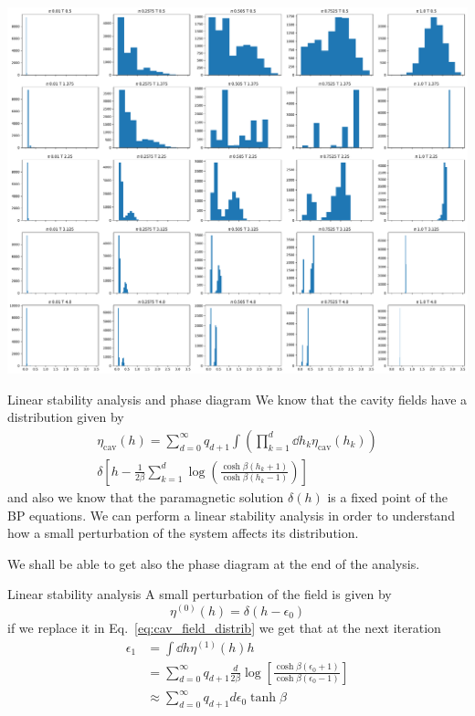 \documentclass[handout]{beamer}
\begin{document}
\begin{frame}[plain]
    \includegraphics[width=.9\textwidth]{pd_fields}
\end{frame}

\begin{frame}{Linear stability analysis and phase diagram}
    We know that the cavity fields have a distribution given by
    \begin{multline}
        \eta_{\text{cav}}(h) =
        \sum_{d=0}^{\infty} q_{d+1}
        \int \left( \prod_{k=1}^d \dd{h_k} \eta_{\text{cav}} (h_k) \right) \\
        \delta \left[ h - \frac{1}{2\beta} \sum_{k=1}^d
            \log\left( \frac{\cosh{\beta(h_k+1)}}{\cosh{\beta(h_k-1)}} \right)
        \right]
        \label{eq:cav_field_distrib}
    \end{multline}
    and also we know that the paramagnetic solution $\delta(h)$ is a
    \alert{fixed point} of the BP equations. We can perform a \alert{linear
    stability analysis} in order to understand how a small perturbation of the
    system affects its distribution.

    We shall be able to get also the phase diagram at the end of the analysis.
\end{frame}

\begin{frame}{Linear stability analysis}
    A small perturbation of the field is given by
    \begin{equation}
        \eta^{(0)} (h) = \delta(h-\epsilon_0)
    \end{equation}
    if we replace it in Eq.~\ref{eq:cav_field_distrib} we get that at the next
    iteration
    \begin{align}
        \epsilon_1 &= \int \dd{h} \eta^{(1)}(h) h\\
                   &= \sum_{d=0}^{\infty} q_{d+1} \frac{d}{2\beta} \log \left[
                       \frac{\cosh{\beta(\epsilon_0+1)}}{\cosh{\beta(\epsilon_0-1)}}
                   \right]\\
                   &\approx \sum_{d=0}^{\infty} q_{d+1} d \epsilon_0
                   \tanh{\beta}
    \end{align}
\end{frame}
\end{document}
